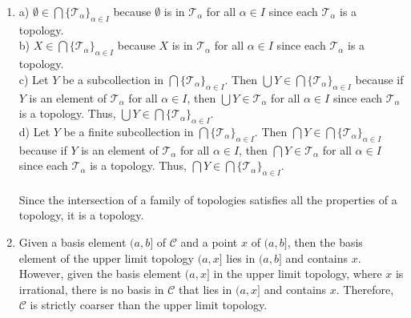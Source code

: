 \documentclass{article}
\begin{document}
\begin{enumerate}
\item
a) $\emptyset \in \bigcap \{\mathcal{T}_{\alpha}\}_{\alpha \in I}$ because $\emptyset$ is in $\mathcal{T}_{\alpha}$ for all $\alpha \in I$ since each $\mathcal{T}_{\alpha}$ is a topology.
\\b) $X \in \bigcap \{\mathcal{T}_{\alpha}\}_{\alpha \in I}$ because $X$ is in $\mathcal{T}_{\alpha}$ for all $\alpha \in I$ since each $\mathcal{T}_{\alpha}$ is a topology.
\\c) Let $Y$ be a subcollection in $\bigcap \{\mathcal{T}_{\alpha}\}_{\alpha \in I}$. Then $\bigcup Y \in \bigcap \{\mathcal{T}_{\alpha}\}_{\alpha \in I}$ because if $Y$ is an element of $\mathcal{T}_{\alpha}$ for all ${\alpha \in I}$, then $\bigcup Y \in \mathcal{T}_{\alpha}$ for all ${\alpha \in I}$ since each $\mathcal{T}_{\alpha}$ is a topology. Thus, $\bigcup Y \in \bigcap \{\mathcal{T}_{\alpha}\}_{\alpha \in I}$.
\\d) Let $Y$ be a finite subcollection in $\bigcap \{\mathcal{T}_{\alpha}\}_{\alpha \in I}$. Then $\bigcap Y \in \bigcap \{\mathcal{T}_{\alpha}\}_{\alpha \in I}$ because if $Y$ is an element of $\mathcal{T}_{\alpha}$ for all ${\alpha \in I}$, then $\bigcap Y \in \mathcal{T}_{\alpha}$ for all ${\alpha \in I}$ since each $\mathcal{T}_{\alpha}$ is a topology. Thus, $\bigcap Y \in \bigcap \{\mathcal{T}_{\alpha}\}_{\alpha \in I}$.
\\\\Since the intersection of a family of topologies satisfies all the properties of a topology, it is a topology.

\item
Given a basis element $(a,b]$ of $\mathcal{C}$ and a point $x$ of $(a,b]$, then the basis element of the upper limit topology $(a,x]$ lies in $(a,b]$ and contains $x$. However, given the basis element $(a,x]$ in the upper limit topology, where $x$ is irrational, there is no basis in $\mathcal{C}$ that lies in $(a,x]$ and contains $x$. Therefore, $\mathcal{C}$ is strictly coarser than the upper limit topology.


\end{enumerate}
\end{document}
